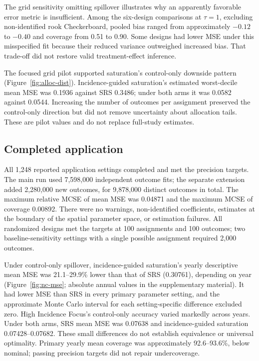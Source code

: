 \documentclass[Afour,sagev,times]{sagej}
\begin{document}
The grid sensitivity omitting spillover illustrates why an apparently favorable error metric is insufficient. Among the six-design comparisons at $\tau=1$, excluding non-identified rook Checkerboard, pooled bias ranged from approximately $-0.12$ to $-0.40$ and coverage from 0.51 to 0.90. Some designs had lower MSE under this misspecified fit because their reduced variance outweighed increased bias. That trade-off did not restore valid treatment-effect inference.

The focused grid pilot supported saturation's control-only downside pattern (Figure~\ref{fig:alloc-dist}). Incidence-guided saturation's estimated worst-decile mean MSE was 0.1936 against SRS 0.3486; under both arms it was 0.0582 against 0.0544. Increasing the number of outcomes per assignment preserved the control-only direction but did not remove uncertainty about allocation tails. These are pilot values and do not replace full-study estimates.

\subsection{Completed application}
All 1,248 reported application settings completed and met the precision targets. The main run used 7,598,000 independent outcome fits; the separate extension added 2,280,000 new outcomes, for 9,878,000 distinct outcomes in total. The maximum relative MCSE of mean MSE was 0.04871 and the maximum MCSE of coverage 0.00892. There were no warnings, non-identified coefficients, estimates at the boundary of the spatial parameter space, or estimation failures. All randomized designs met the targets at 100 assignments and 100 outcomes; two baseline-sensitivity settings with a single possible assignment required 2,000 outcomes.

Under control-only spillover, incidence-guided saturation's yearly descriptive mean MSE was 21.1--29.9\% lower than that of SRS (0.30761), depending on year (Figure~\ref{fig:nc-mse}; absolute annual values in the supplementary material). It had lower MSE than SRS in every primary parameter setting, and the approximate Monte Carlo interval for each setting-specific difference excluded zero. High Incidence Focus's control-only accuracy varied markedly across years. Under both arms, SRS mean MSE was 0.07638 and incidence-guided saturation 0.07428--0.07682. These small differences do not establish equivalence or universal optimality. Primary yearly mean coverage was approximately 92.6--93.6\%, below nominal; passing precision targets did not repair undercoverage.
\ifctjreading
\CTJMeanFigure
\fi
\end{document}
